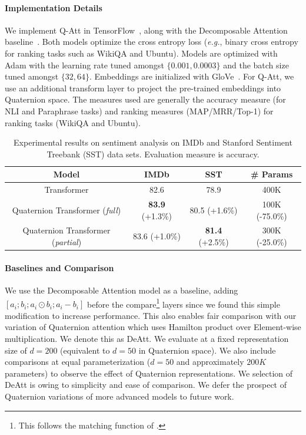 \documentclass[11pt,a4paper]{article}
\begin{document}
\paragraph{Implementation Details} We implement Q-Att in TensorFlow~\cite{abadi2016tensorflow}, along with the Decomposable Attention baseline~\cite{parikh2016decomposable}. Both models optimize the cross entropy loss (\emph{e.g.}, binary cross entropy for ranking tasks such as WikiQA and Ubuntu). Models are optimized with Adam with the learning rate tuned amongst $\{0.001, 0.0003\}$ and the batch size tuned amongst $\{32,64\}$. Embeddings are initialized with GloVe~\cite{pennington2014glove}. For Q-Att, we use an additional transform layer to project the pre-trained embeddings into Quaternion space. The measures used are generally the accuracy measure (for NLI and Paraphrase tasks) and ranking measures (MAP/MRR/Top-1) for ranking tasks (WikiQA and Ubuntu).
\begin{table}
  \centering
    \begin{tabular}{c|c|c|c}
    \hline
    Model & \multicolumn{1}{c|}{IMDb} & \multicolumn{1}{c|}{SST} & \multicolumn{1}{c}{\# Params} \\
    \hline
    Transformer & 82.6 & 78.9& 400K  \\
    Quaternion Transformer (\emph{full}) & \textbf{83.9} (+1.3\%) & 80.5 (+1.6\%) & 100K (-75.0\%)  \\
    Quaternion Transformer (\emph{partial}) & 83.6 (+1.0\%) & \textbf{81.4} (+2.5\%) &300K  (-25.0\%)  \\
    \hline
    \end{tabular}%
    \caption{Experimental results on sentiment analysis on IMDb and Stanford Sentiment Treebank (SST) data sets. Evaluation measure is accuracy.}
     \label{tab:sentiment}%
\end{table}%

\paragraph{Baselines and Comparison} We use the Decomposable Attention model as a baseline, adding $[a_i;b_i;a_i\odot b_i; a_i-b_i]$ before the compare\footnote{This follows the matching function of \cite{chen2016enhanced}.} layers since we found this simple modification to increase performance. This also enables fair comparison with our variation of Quaternion attention which uses Hamilton product over Element-wise multiplication. We denote this as DeAtt. We evaluate at a fixed representation size of $d=200$ (equivalent to $d=50$ in Quaternion space). We also include comparisons at equal parameterization ($d=50$ and approximately $200K$ parameters) to observe the effect of Quaternion representations. We selection of DeAtt is owing to simplicity and ease of comparison. We defer the prospect of Quaternion variations of more advanced models \cite{chen2016enhanced,tay2017compare} to future work.
\end{document}
